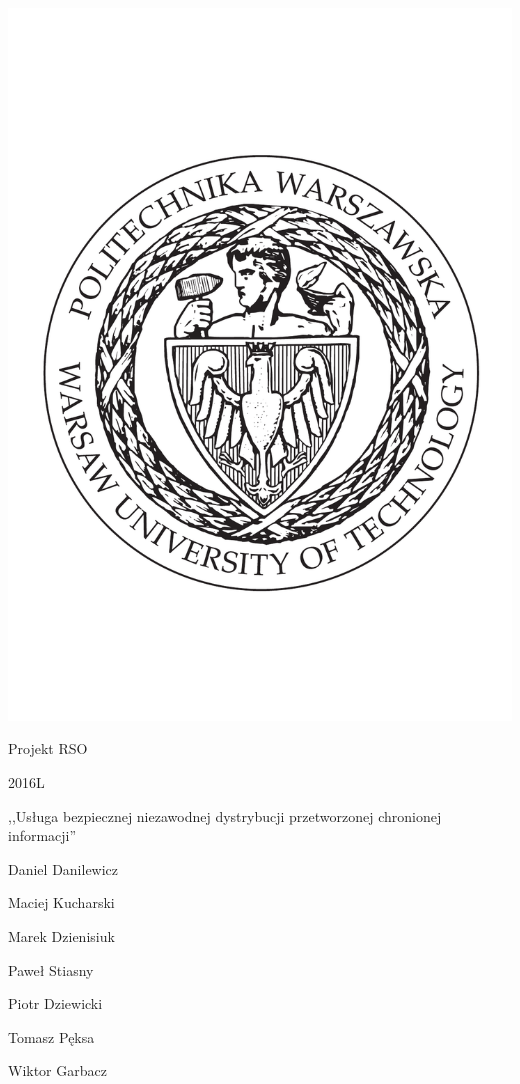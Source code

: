 \documentclass[11pt]{article}
\title{}
\author{
  Daniel Danilewicz \\
  Maciej Kucharski \\
  Marek Dzienisiuk \\
  Paweł Stiasny (kierownik) \\
  Piotr Dziewicki \\
  Tomasz Pęksa \\
  Wiktor Garbacz \\
}
\begin{document}
\begin{titlepage}
  \centering
  \includegraphics[scale=0.3]{logopw.pdf} \par
  \vspace{0.5cm}

  {\Large Projekt RSO \par 2016L \par}
  \vspace{1cm}
  {\LARGE ,,Usługa bezpiecznej niezawodnej dystrybucji przetworzonej chronionej
          informacji'' \par}

  \vspace{2cm}

  Daniel Danilewicz \par
  Maciej Kucharski \par
  Marek Dzienisiuk \par
  Paweł Stiasny \par
  Piotr Dziewicki \par
  Tomasz Pęksa \par
  Wiktor Garbacz \par

  \vfill
\end{titlepage}
\end{document}
